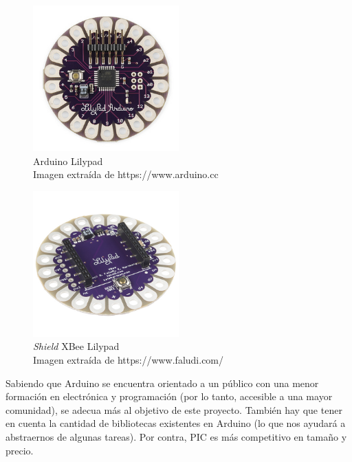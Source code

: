 \begin{description}
\begin{figure}[!htb]
    \centering
    \captionsetup{justification=centering}
    \includegraphics[width=0.5\textwidth]{./imagenes/lilypad}
    \caption{Arduino Lilypad\\
     \scriptsize{Imagen extraída de https://www.arduino.cc}} \label{fig:lilypad}
    \end{figure}

    \begin{figure}[htb]
    \centering
    \captionsetup{justification=centering}
    \includegraphics[width=0.5\textwidth]{./imagenes/lilypadxbee}
    \caption{\textit{Shield} XBee Lilypad\\
      \scriptsize{Imagen extraída de https://www.faludi.com/ \cite{faludi}}} \label{fig:lilypadxbee}
    \end{figure}
\end{description}


Sabiendo que Arduino se encuentra orientado a un público con una menor formación en electrónica y
programación (por lo tanto, accesible a una mayor comunidad), se adecua más al objetivo de este proyecto.
También hay que tener en cuenta la cantidad de bibliotecas
existentes en Arduino (lo que nos ayudará a abstraernos de algunas tareas). Por contra,
PIC es más competitivo en tamaño y precio.\\

